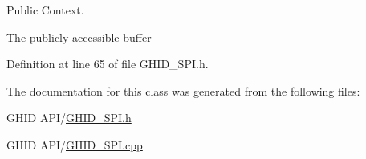 \-Public \-Context. 

\-The publicly accessible buffer 

\-Definition at line 65 of file \-G\-H\-I\-D\-\_\-\-S\-P\-I.\-h.



\-The documentation for this class was generated from the following files\-:\begin{DoxyCompactItemize}
\item 
\-G\-H\-I\-D A\-P\-I/\hyperlink{_g_h_i_d___s_p_i_8h}{\-G\-H\-I\-D\-\_\-\-S\-P\-I.\-h}\item 
\-G\-H\-I\-D A\-P\-I/\hyperlink{_g_h_i_d___s_p_i_8cpp}{\-G\-H\-I\-D\-\_\-\-S\-P\-I.\-cpp}\end{DoxyCompactItemize}
